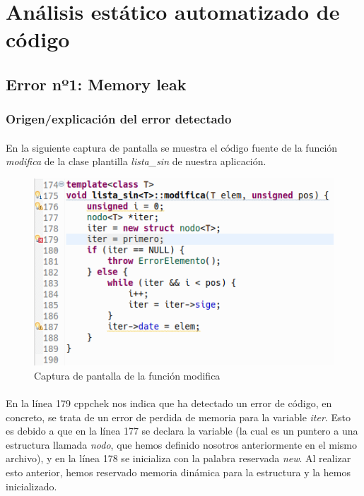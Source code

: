\section{Análisis estático automatizado de código}

	\subsection{Error nº1: Memory leak}

		\subsubsection{Origen/explicación del error detectado}
		
			\paragraph{}En la siguiente captura de pantalla se muestra el código fuente de la función \textit{modifica} de la clase plantilla \textit{lista\_sin} de nuestra aplicación.
			
			\begin{figure}[H]
				\centering
				\includegraphics[scale=0.7]{img/captura42.png}
				\caption{Captura de pantalla de la función modifica}
				\label{captura42}
			\end{figure}
		
			\paragraph{}En la línea 179 cppchek nos indica que ha detectado un error de código, en concreto, se trata de un error de perdida de memoria para la variable \textit{iter}. Esto es debido a que en la línea 177 se declara la variable (la cual es un puntero a una estructura llamada \textit{nodo}, que hemos definido nosotros anteriormente en el mismo archivo), y en la línea 178 se inicializa con la palabra reservada \textit{new}. Al realizar esto anterior, hemos reservado memoria dinámica para la estructura y la hemos inicializado.
			
